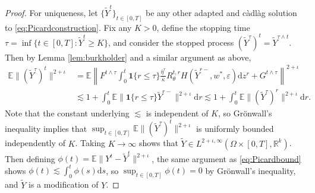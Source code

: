 \documentclass[11pt,letterpaper,reqno]{amsart}
\theoremstyle{definition}
\def\eps{\varepsilon}
\def\d{\mathrm{d}}
\def\E{\mathbb{E}}
\def\R{\mathbb{R}}
\def\1{\mathbf{1}}
\begin{document}
\begin{proof}
For uniqueness, let $\{\widetilde Y^t\}_{t \in [0,T]}$ be any other adapted
and c\`adl\`ag solution
to \eqref{eq:Picardconstruction}. Fix any $K>0$, define
the stopping time $\tau=\inf\{t \in [0,T]:\widetilde Y^t \geq K\}$,
and consider the stopped process 
$(\widetilde Y^\tau)^t=\widetilde Y^{\tau \wedge t}$. Then
by Lemma \ref{lem:burkholder} and a similar argument as above,
\begin{align*}
\E\|(\widetilde Y^\tau)^t\|^{2+\iota}
&=\E\left\|F^{t \wedge \tau}
\int_0^t \1\{r \leq \tau\}\frac{\bar \eta^r}{\bar\kappa}
R_\theta^{t,r}H(\widetilde Y^{r-},w^*,\eps)\d z^r
+G^{t \wedge \tau}\right\|^{2+\iota}\\
&\lesssim 1+\int_0^t
\E \|\1\{r \leq \tau\}\widetilde Y^{r-}\|^{2+\iota}\d r
\lesssim 1+\int_0^t \E\|(\widetilde Y^\tau)^r\|^{2+\iota}\d r.
\end{align*}
Note that the constant underlying $\lesssim$ is independent of $K$, so Gr\"onwall's
inequality implies that $\sup_{t \in [0,T]} \E\|(\widetilde Y^\tau)^t\|^{2+\iota}$ is uniformly
bounded independently of $K$. Taking $K \to \infty$
shows that $\widetilde Y \in L^{2+\iota,\infty}(\Omega \times [0,T],\R^k)$.
Then defining $\phi(t)=\E \|Y^t-\widetilde Y^t\|^{2+\iota}$,
the same argument as \eqref{eq:Picardbound} shows
$\phi(t) \lesssim \int_0^t \phi(s)\d s$, so $\sup_{t \in [0,T]} \phi(t)=0$ by Gr\"onwall's inequality, and $\widetilde Y$ is a modification of $Y$.
\end{proof}
\end{document}
